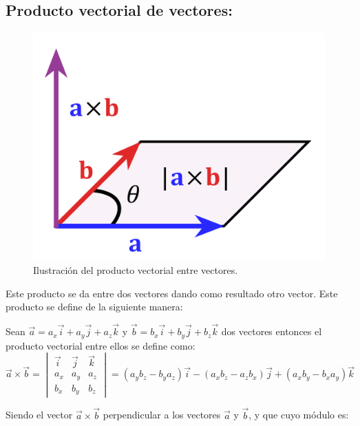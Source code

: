 \subsection{Producto vectorial de vectores:}

\begin{figure}[H]
 \centering
 \includegraphics[scale=0.1]{images/1200px-Cross_product_parallelogram.png}
 \caption{Ilustración del producto vectorial entre vectores.}
 \label{fig:vectorial}
\end{figure}

Este producto se da entre dos vectores dando como resultado otro vector. Este producto se define de la siguiente manera:

\begin{tcolorbox}
 Sean $\vec{a} =a_x\vec{i}+a_y\vec{j}+a_z\vec{k}$ y $\vec{b}=b_x\vec{i}+b_y\vec{j}+b_z\vec{k}$ dos vectores entonces el 
 producto vectorial entre ellos se define como: 
\scriptsize{ 
 \[
\vec{a}\times\vec{b} =
\begin{vmatrix}
\vec{i} & \vec{j} & \vec{k} \\ 
a_x & a_y & a_z \\
b_x & b_y & b_z
\end{vmatrix} = (a_yb_z-b_ya_z)\vec{i}-(a_xb_z-a_zb_x)\vec{j}+(a_xb_y-b_xa_y)\vec{k}
\]}
\end{tcolorbox}

Siendo el vector $\vec{a}\times\vec{b}$ perpendicular a los vectores $\vec{a}$ y $\vec{b}$, y que cuyo módulo es:


